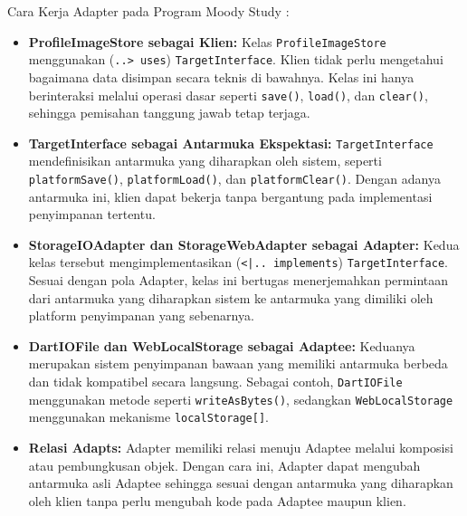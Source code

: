 \documentclass[11pt]{article}
\begin{document}
Cara Kerja Adapter pada Program Moody Study :
\begin{itemize}

\item \textbf{ProfileImageStore sebagai Klien:} Kelas \texttt{ProfileImageStore} menggunakan (\texttt{..> uses}) \texttt{TargetInterface}. Klien tidak perlu mengetahui bagaimana data disimpan secara teknis di bawahnya. Kelas ini hanya berinteraksi melalui operasi dasar seperti \texttt{save()}, \texttt{load()}, dan \texttt{clear()}, sehingga pemisahan tanggung jawab tetap terjaga.

\item \textbf{TargetInterface sebagai Antarmuka Ekspektasi:} \texttt{TargetInterface} mendefinisikan antarmuka yang diharapkan oleh sistem, seperti \texttt{platformSave()}, \texttt{platformLoad()}, dan \texttt{platformClear()}. Dengan adanya antarmuka ini, klien dapat bekerja tanpa bergantung pada implementasi penyimpanan tertentu.

\item \textbf{StorageIOAdapter dan StorageWebAdapter sebagai Adapter:} Kedua kelas tersebut mengimplementasikan (\texttt{<|.. implements}) \texttt{TargetInterface}. Sesuai dengan pola Adapter, kelas ini bertugas menerjemahkan permintaan dari antarmuka yang diharapkan sistem ke antarmuka yang dimiliki oleh platform penyimpanan yang sebenarnya.

\item \textbf{DartIOFile dan WebLocalStorage sebagai Adaptee:} Keduanya merupakan sistem penyimpanan bawaan yang memiliki antarmuka berbeda dan tidak kompatibel secara langsung. Sebagai contoh, \texttt{DartIOFile} menggunakan metode seperti \texttt{writeAsBytes()}, sedangkan \texttt{WebLocalStorage} menggunakan mekanisme \texttt{localStorage[]}.

\item \textbf{Relasi Adapts:} Adapter memiliki relasi menuju Adaptee melalui komposisi atau pembungkusan objek. Dengan cara ini, Adapter dapat mengubah antarmuka asli Adaptee sehingga sesuai dengan antarmuka yang diharapkan oleh klien tanpa perlu mengubah kode pada Adaptee maupun klien.

\end{itemize}
\end{document}
